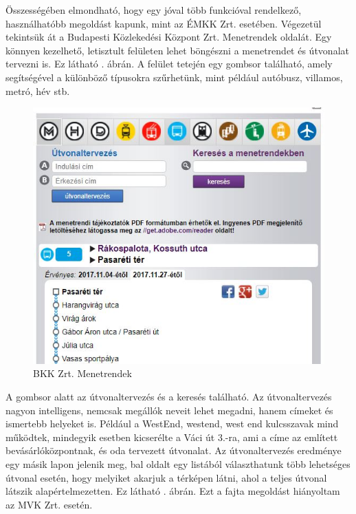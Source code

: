 Összességében elmondható, hogy egy jóval több funkcióval rendelkező, használhatóbb megoldást kapunk, mint az ÉMKK Zrt. esetében.
Végezetül tekintsük át a Budapesti Közlekedési Központ Zrt. Menetrendek oldalát. Egy könnyen kezelhető, letisztult felületen lehet böngészni a menetrendet és útvonalat tervezni is. Ez látható . ábrán. A felület tetején egy gombsor található, amely segítségével a különböző típusokra szűrhetünk, mint például autóbusz, villamos, metró, hév stb.

\begin{figure}[h!]
\centering
\includegraphics[scale=0.8]{kepek/bkk_menetrend.jpg}
\caption{BKK Zrt. Menetrendek}
\label{fig:bkk_menetrend}
\end{figure}

A gombsor alatt az útvonaltervezés és a keresés található. Az útvonaltervezés nagyon intelligens, nemcsak megállók neveit lehet megadni, hanem címeket és ismertebb helyeket is. Például a WestEnd, westend, west end kulcsszavak mind működtek, mindegyik esetben kicserélte a Váci út 3.-ra, ami a címe az említett bevásárlóközpontnak, és oda tervezett útvonalat. Az útvonaltervezés eredménye egy másik lapon jelenik meg, bal oldalt egy listából választhatunk több lehetséges útvonal esetén, hogy melyiket akarjuk a térképen látni, ahol a teljes útvonal látszik alapértelmezetten. Ez látható . ábrán. Ezt a fajta megoldást hiányoltam az MVK Zrt. esetén.

